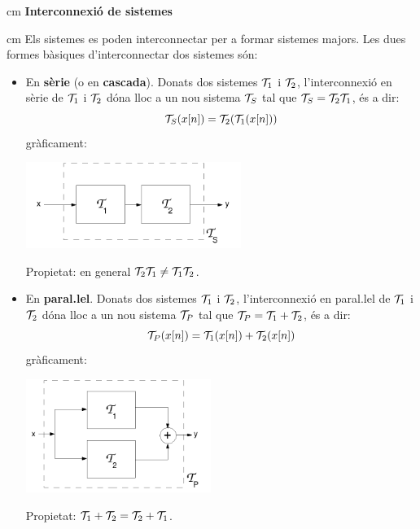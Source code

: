 \documentclass{article}
\begin{document}
 cm
\noindent
\textbf{Interconnexi\'o de sistemes}

 cm
\noindent
Els sistemes es poden interconnectar per a formar sistemes majors.
Les dues formes b\`asiques d'interconnectar dos sistemes s\'on:
\begin{itemize}
\item En \textbf{s\`erie} (o en \textbf{cascada}).
Donats dos sistemes ${\cal T}_1$ i ${\cal T}_2$, l'interconnexi\'o
en s\`erie de ${\cal T}_1$ i ${\cal T}_2$ d\'ona lloc a un nou sistema
${\cal T}_S$ tal que ${\cal T}_S={\cal T}_2 {\cal T}_1$, \'es a dir:
\[
{\cal T}_S(x[n])={\cal T}_2({\cal T}_1(x[n]))
\]
\noindent
gr\`aficament:

\begin{center}
\begin{minipage}{7cm}\includegraphics[width=7cm]{serie.png}\end{minipage}
\end{center}

\vskip 0.2cm
\noindent
Propietat: en general ${\cal T}_2 {\cal T}_1 \neq {\cal T}_1 {\cal T}_2$.

\item En \textbf{paral.lel}.
Donats dos sistemes ${\cal T}_1$ i ${\cal T}_2$, l'interconnexi\'o
en paral.lel de ${\cal T}_1$ i ${\cal T}_2$ d\'ona lloc a un nou sistema
${\cal T}_P$ tal que ${\cal T}_P={\cal T}_1 + {\cal T}_2$, \'es a dir:
\[
{\cal T}_P(x[n])={\cal T}_1(x[n]) + {\cal T}_2(x[n])
\]
\noindent
gr\`aficament:

\begin{center}
\begin{minipage}{6cm}\includegraphics[width=6cm]{parallel.png}\end{minipage}
\end{center}

\vskip 0.2cm
\noindent
Propietat: ${\cal T}_1 + {\cal T}_2 = {\cal T}_2 + {\cal T}_1$.

\end{itemize}
\end{document}

